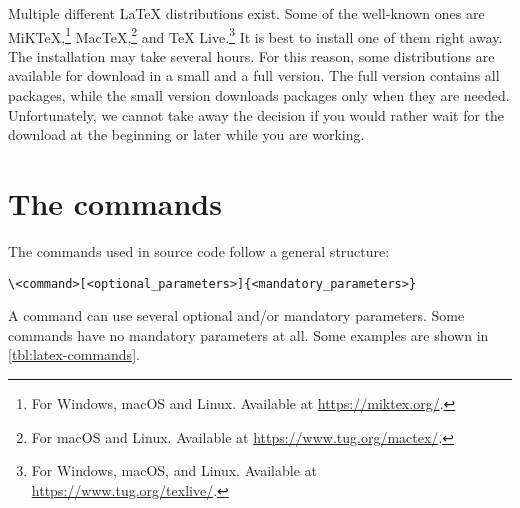 Multiple different \LaTeX{} distributions exist. 
Some of the well-known ones are MiK\TeX,\footnote{For Windows, macOS and Linux. Available at \url{https://miktex.org/}.} Mac\TeX,\footnote{For macOS and Linux. Available at \url{https://www.tug.org/mactex/}.} and \TeX{} Live.\footnote{For Windows, macOS, and Linux. Available at \url{https://www.tug.org/texlive/}.}
It is best to install one of them right away. 
The installation may take several hours. 
For this reason, some distributions are available for download in a small and a full version. 
The full version contains all packages, while the small version downloads packages only when they are needed.
Unfortunately, we cannot take away the decision if you would rather wait for the download at the beginning or later while you are working.

\section{The commands}
\label{subsec:command-structure}
The commands used in source code follow a general structure:
\begin{verbatim}
\<command>[<optional_parameters>]{<mandatory_parameters>}
\end{verbatim}
A command can use several optional and/or mandatory parameters. 
Some commands have no mandatory parameters at all. 
Some examples are shown in \cref{tbl:latex-commands}.

\begin{table}[h!]
	\caption{Examples for \LaTeX-commands}
	\label{tbl:latex-commands}
\end{table}

